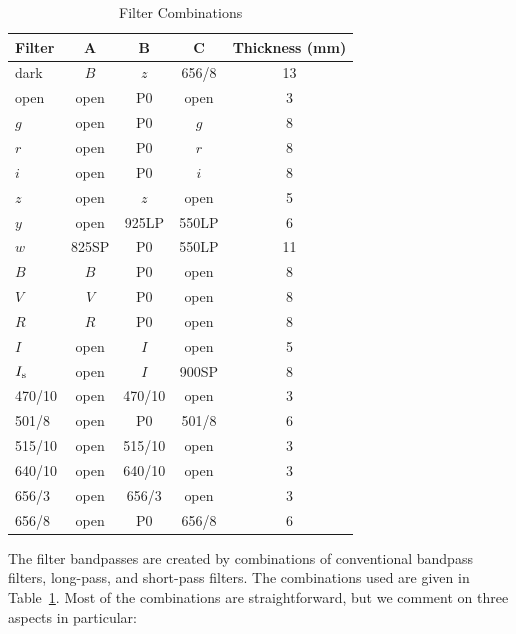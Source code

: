 \begin{table}
\begin{center}
\caption{Filter Combinations}
\label{table:filter-combinations}
\medskip
\begin{tabular}{lcccc}
\hline
Filter&A&B&C&Thickness (mm)\\
\hline
dark		&$B$		&$z$		&656/8	&\phantom{}13		\\
open		&open		&P0		&open		&\phantom{0}3		\\
$g$		&open		&P0		&$g$		&\phantom{0}8		\\
$r$		&open		&P0		&$r$		&\phantom{0}8		\\
$i$			&open		&P0		&$i$		&\phantom{0}8		\\
$z$		&open		&$z$		&open		&\phantom{0}5		\\
$y$		&open		&925LP	&550LP	&\phantom{0}6		\\
$w$		&825SP	&P0		&550LP	&\phantom{}11		\\
$B$		&$B$		&P0		&open		&\phantom{0}8		\\
$V$		&$V$		&P0		&open		&\phantom{0}8		\\
$R$		&$R$		&P0		&open		&\phantom{0}8		\\
$I$		&open		&$I$		&open		&\phantom{0}5		\\
$\mbox{$I_\mathrm{s}$}$		&open		&$I$		&900SP	&\phantom{0}8		\\
470/10	&open		&470/10	&open		&\phantom{0}3		\\
501/8		&open		&P0		&501/8	&\phantom{0}6		\\
515/10	&open		&515/10	&open		&\phantom{0}3		\\
640/10	&open		&640/10	&open		&\phantom{0}3		\\
656/3		&open		&656/3	&open		&\phantom{0}3		\\
656/8		&open		&P0		&656/8	&\phantom{0}6		\\
\hline
\end{tabular}
\end{center}
\end{table}

The filter bandpasses are created by combinations of conventional bandpass filters, long-pass, and short-pass filters. The combinations used are given in Table~\ref{table:filter-combinations}. Most of the combinations are straightforward, but we comment on three aspects in particular:

